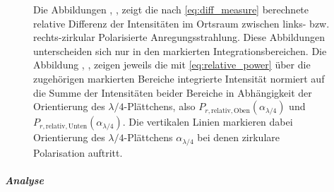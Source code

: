 \documentclass[titlepage,  ngerman]{article}
\begin{document}
\begin{figure}
			\caption{Die Abbildungen , ,  zeigt die nach \eqref{eq:diff_measure} berechnete relative Differenz der Intensitäten im Ortsraum zwischen links- bzw. rechts-zirkular Polarisierte Anregungsstrahlung. Diese Abbildungen unterscheiden sich nur in den markierten Integrationsbereichen. Die Abbildung , ,  zeigen jeweils die mit \eqref{eq:relative_power} über die zugehörigen markierten Bereiche integrierte Intensität normiert auf die Summe der Intensitäten beider Bereiche in Abhängigkeit der Orientierung des $\lambda/4$-Plättchens, also $P_{r, \mathrm{relativ}, \mathrm{Oben}}(\alpha_{\lambda/4})$ und $P_{r, \mathrm{relativ}, \mathrm{Unten}}(\alpha_{\lambda/4})$. Die vertikalen Linien markieren dabei  Orientierung des $\lambda/4$-Plättchens $\alpha_{\lambda/4}$ bei denen zirkulare Polarisation auftritt.}
			\label{fig:spin_hall_measure_diff_fp}
		\end{figure}
		\subparagraph{Analyse}
\end{document}
